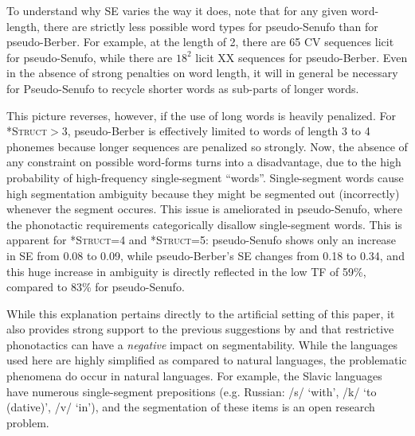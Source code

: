\documentclass[11pt]{article}
\begin{document}
To understand why SE varies the way it does, note that for any given word-length, there are strictly less possible word types for pseudo-Senufo than for pseudo-Berber. For example, at the length of 2, there are 65 CV sequences licit for pseudo-Senufo, while there are $18^2$ licit XX sequences for pseudo-Berber. Even in the absence of strong penalties on word length, it will in general be necessary for Pseudo-Senufo to recycle shorter words as sub-parts of longer words. 

This picture reverses, however, if the use of long words is heavily penalized. For \textsc{*Struct}$>$3, pseudo-Berber is effectively limited to words of length 3 to 4 phonemes because longer sequences are penalized so strongly. Now, the absence of any constraint on possible word-forms turns into a disadvantage, due to the high probability of high-frequency single-segment ``words''. Single-segment words cause high segmentation ambiguity because they might be segmented out (incorrectly) whenever the segment occures. This issue is ameliorated in pseudo-Senufo, where the phonotactic requirements categorically disallow single-segment words. This is apparent for \textsc{*Struct}=4 and \textsc{*Struct}=5: pseudo-Senufo shows only an increase in SE from 0.08 to 0.09, while pseudo-Berber's SE changes from 0.18 to 0.34, and this huge increase in ambiguity is directly reflected in the low TF of 59\%, compared to 83\% for pseudo-Senufo.

While this explanation pertains directly to the artificial setting of this paper, it also provides strong support to the previous suggestions by \cite{Daland13a} and \cite{Fourtassi13a} that restrictive phonotactics can have a \emph{negative} impact on segmentability. While the languages used here are highly simplified as compared to natural languages, the problematic phenomena do occur in natural languages. For example, the Slavic languages have numerous single-segment prepositions (e.g. Russian: /s/ `with', /k/ `to (dative)', /v/ `in'), and the segmentation of these items is an open research problem.
\end{document}
